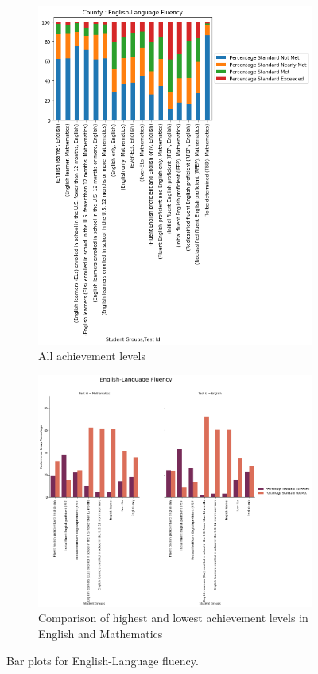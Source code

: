 \documentclass[11pt]{article}
\begin{document}
\begin{figure}[h!]
\centering
\begin{subfigure}{0.35\textwidth}
         \centering
         \includegraphics[width=\textwidth]{output_31_0.png}
         \caption{All achievement levels}
         \label{fig:English_all}
\end{subfigure}
\hfill
\begin{subfigure}{0.6\textwidth}
         \centering
         \includegraphics[width=\textwidth]{output_32_1.png}
         \caption{Comparison of highest and lowest achievement levels 
in English and Mathematics}
         \label{fig:English_two}
\end{subfigure}
\caption{Bar plots for English-Language fluency.}
\label{fig:all_English}
\end{figure}
\end{document}
